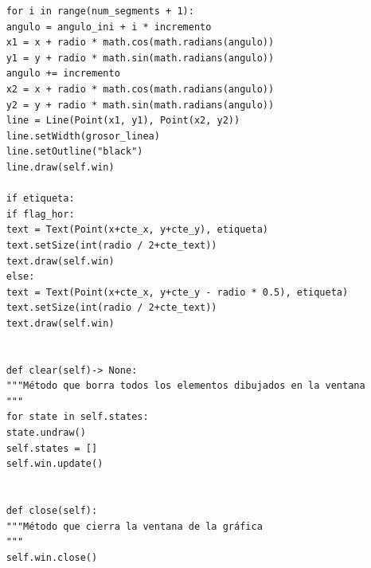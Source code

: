 \documentclass[11pt]{article} %
\begin{document}
\begin{lstlisting}
	for i in range(num_segments + 1):
	angulo = angulo_ini + i * incremento
	x1 = x + radio * math.cos(math.radians(angulo))
	y1 = y + radio * math.sin(math.radians(angulo))
	angulo += incremento
	x2 = x + radio * math.cos(math.radians(angulo))
	y2 = y + radio * math.sin(math.radians(angulo))
	line = Line(Point(x1, y1), Point(x2, y2))
	line.setWidth(grosor_linea)
	line.setOutline("black")
	line.draw(self.win)
	
	if etiqueta:
	if flag_hor:
	text = Text(Point(x+cte_x, y+cte_y), etiqueta)
	text.setSize(int(radio / 2+cte_text))
	text.draw(self.win)
	else:
	text = Text(Point(x+cte_x, y+cte_y - radio * 0.5), etiqueta)
	text.setSize(int(radio / 2+cte_text))
	text.draw(self.win)
	
	
	def clear(self)-> None:
	"""Método que borra todos los elementos dibujados en la ventana
	"""
	for state in self.states:
	state.undraw()
	self.states = []
	self.win.update()
	
	
	def close(self):
	"""Método que cierra la ventana de la gráfica
	"""
	self.win.close()
	
	\end{lstlisting}
	
	
	
\end{document}
